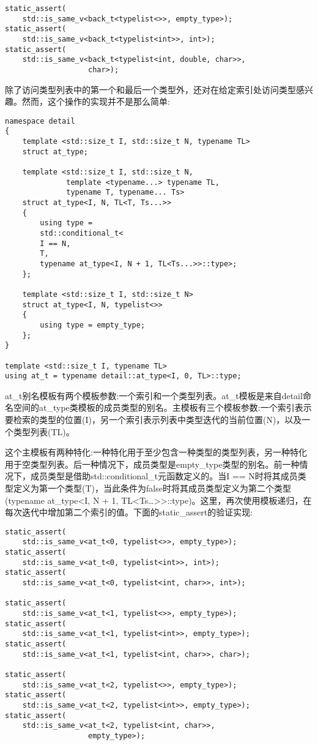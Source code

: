 \begin{lstlisting}[style=styleCXX]
static_assert(
	std::is_same_v<back_t<typelist<>>, empty_type>);
static_assert(
	std::is_same_v<back_t<typelist<int>>, int>);
static_assert(
	std::is_same_v<back_t<typelist<int, double, char>>,
				   char>);
\end{lstlisting}

除了访问类型列表中的第一个和最后一个类型外，还对在给定索引处访问类型感兴趣。然而，这个操作的实现并不是那么简单:

\begin{lstlisting}[style=styleCXX]
namespace detail
{
	template <std::size_t I, std::size_t N, typename TL>
	struct at_type;
	
	template <std::size_t I, std::size_t N,
			  template <typename...> typename TL,
			  typename T, typename... Ts>
	struct at_type<I, N, TL<T, Ts...>>
	{
		using type =
		std::conditional_t<
		I == N,
		T,
		typename at_type<I, N + 1, TL<Ts...>>::type>;
	};

	template <std::size_t I, std::size_t N>
	struct at_type<I, N, typelist<>>
	{
		using type = empty_type;
	};
}

template <std::size_t I, typename TL>
using at_t = typename detail::at_type<I, 0, TL>::type;
\end{lstlisting}

at\_t别名模板有两个模板参数:一个索引和一个类型列表。at\_t模板是来自detail命名空间的at\_type类模板的成员类型的别名。主模板有三个模板参数:一个索引表示要检索的类型的位置(I)，另一个索引表示列表中类型迭代的当前位置(N)，以及一个类型列表(TL)。

这个主模板有两种特化:一种特化用于至少包含一种类型的类型列表，另一种特化用于空类型列表。后一种情况下，成员类型是empty\_type类型的别名。前一种情况下，成员类型是借助std::conditional\_t元函数定义的。当I == N时将其成员类型定义为第一个类型(T)，当此条件为false时将其成员类型定义为第二个类型(typename at\_type<I, N + 1, TL<Ts…>{}>::type)。这里，再次使用模板递归，在每次迭代中增加第二个索引的值。下面的static\_assert的验证实现:

\begin{lstlisting}[style=styleCXX]
static_assert(
	std::is_same_v<at_t<0, typelist<>>, empty_type>);
static_assert(
	std::is_same_v<at_t<0, typelist<int>>, int>);
static_assert(
	std::is_same_v<at_t<0, typelist<int, char>>, int>);
	
static_assert(
	std::is_same_v<at_t<1, typelist<>>, empty_type>);
static_assert(
	std::is_same_v<at_t<1, typelist<int>>, empty_type>);
static_assert(
	std::is_same_v<at_t<1, typelist<int, char>>, char>);
	
static_assert(
	std::is_same_v<at_t<2, typelist<>>, empty_type>);
static_assert(
	std::is_same_v<at_t<2, typelist<int>>, empty_type>);
static_assert(
	std::is_same_v<at_t<2, typelist<int, char>>,
				   empty_type>);
\end{lstlisting}

